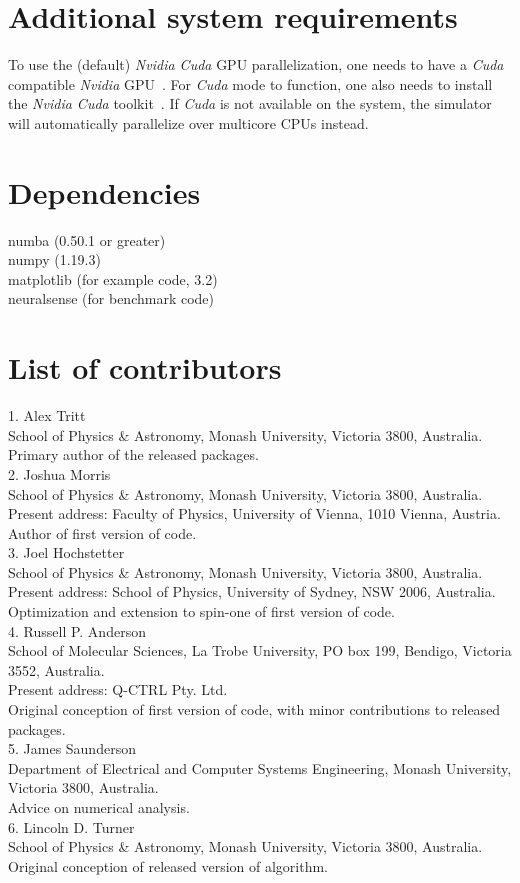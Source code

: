\documentclass{jors}
\begin{document}
\section{Additional system requirements}
To use the (default) \emph{Nvidia Cuda} GPU parallelization, one needs to have a \emph{Cuda} compatible \emph{Nvidia} GPU~\cite{noauthor_cuda_2012}.
For \emph{Cuda} mode to function, one also needs to install the \emph{Nvidia Cuda} toolkit~\cite{noauthor_cuda_2013}.
If \emph{Cuda} is not available on the system, the simulator will automatically parallelize over multicore CPUs instead.

\section{Dependencies}
numba (0.50.1 or greater)\\
numpy (1.19.3)\\
matplotlib (for example code, 3.2)\\
neuralsense (for benchmark code)

\section{List of contributors}

1. Alex Tritt\\
	School of Physics \& Astronomy, Monash University, Victoria 3800, Australia.\\
	Primary author of the released packages.\\
2. Joshua Morris\\
	School of Physics \& Astronomy, Monash University, Victoria 3800, Australia.\\
	Present address: Faculty of Physics, University of Vienna, 1010 Vienna, Austria.\\
	Author of first version of code.\\
3. Joel Hochstetter\\
	School of Physics \& Astronomy, Monash University, Victoria 3800, Australia.\\
	Present address: School of Physics, University of Sydney, NSW 2006, Australia.\\
	Optimization and extension to spin-one of first version of code.\\
4. Russell P. Anderson\\
	School of Molecular Sciences, La Trobe University, PO box 199, Bendigo, Victoria 3552, Australia.\\
	Present address: Q-CTRL Pty. Ltd.\\
	Original conception of first version of code, with minor contributions to released packages.\\
5. James Saunderson\\
	Department of Electrical and Computer Systems Engineering, Monash University, Victoria 3800, Australia.\\
	Advice on numerical analysis.\\
6. Lincoln D. Turner\\
	School of Physics \& Astronomy, Monash University, Victoria 3800, Australia.\\
	Original conception of released version of algorithm.
\end{document}
